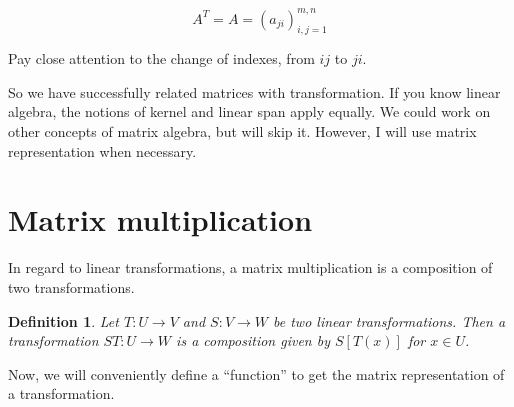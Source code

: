 \documentclass{book}
\newtheorem{definition}{Definition}[section]
\begin{document}
\begin{equation}
    A^{T} = A=\left(a_{ji}\right)^{m,n}_{i,j=1}
\end{equation}

Pay close attention to the change of indexes, from $ij$ to $ji$.

So we have successfully related matrices with transformation. If you know
linear algebra, the notions of kernel and linear span apply equally. We could
work on other concepts of matrix algebra, but will skip it. However, I will use
matrix representation when necessary.

\section{Matrix multiplication}

In regard to linear transformations, a matrix multiplication is a composition
of two transformations.

\begin{definition}
    Let $T: U \to V$ and $S: V \to W$ be two linear transformations. Then a transformation
    $ST : U \to W$ is a composition given by $S\left[T(x)\right]$ for $x\in U$.
\end{definition}
Now, we will conveniently define a ``function'' to get the matrix representation of a transformation.
\end{document}
